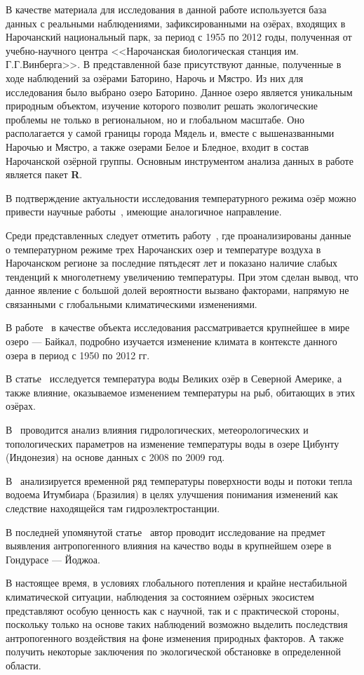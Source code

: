 В качестве материала для исследования в данной работе используется база данных с реальными наблюдениями, зафиксированными на озёрах, входящих в Нарочанский национальный парк, за период с 1955 по 2012 годы, полученная от учебно-научного центра <<Нарочанская биологическая станция им. Г.Г.Винберга>>. В представленной базе присутствуют данные, полученные в ходе наблюдений за озёрами Баторино, Нарочь и Мястро. Из них для исследования было выбрано озеро Баторино. Данное озеро является уникальным природным объектом, изучение которого позволит решать экологические проблемы не только в региональном, но и глобальном масштабе. Оно располагается у самой границы города Мядель и, вместе с вышеназванными Нарочью и Мястро, а также озерами Белое и Бледное, входит в состав Нарочанской озёрной группы. Основным инструментом анализа данных в работе является пакет \textbf{R}.

В подтверждение актуальности исследования температурного режима озёр можно привести научные работы~\cite{zhukova2014, Katz2011, OBrien2012a, Subehi2011, ALCANTARA2011, Chokshi2006}, имеющие аналогичное направление.

Среди представленных следует отметить работу~\cite{zhukova2014}, где проанализированы данные о температурном режиме трех Нарочанских озер и температуре воздуха в Нарочанском регионе за последние пятьдесят лет и показано наличие слабых тенденций к многолетнему увеличению температуры. При этом сделан вывод, что данное явление с большой долей вероятности вызвано факторами, напрямую не связанными с глобальными климатическими изменениями.

В работе~\cite{Katz2011} в качестве объекта исследования рассматривается крупнейшее в мире озеро --- Байкал, подробно изучается изменение климата в контексте данного озера в период с 1950 по 2012 гг.

В статье~\cite{OBrien2012a} исследуется температура воды Великих озёр в Северной Америке, а также влияние, оказываемое изменением температуры на рыб, обитающих в этих озёрах.

В~\cite{Subehi2011} проводится анализ влияния гидрологических, метеорологических и топологических параметров на изменение температуры воды в озере Цибунту (Индонезия) на основе данных с 2008 по 2009 год.

В~\cite{ALCANTARA2011} анализируется временной ряд температуры поверхности воды и потоки тепла водоема Итумбиара (Бразилия) в целях улучшения понимания изменений как следствие находящейся там гидроэлектростанции.

В последней упомянутой статье~\cite{Chokshi2006} автор проводит исследование на предмет выявления антропогенного влияния на качество воды в крупнейшем озере в Гондурасе --- Йоджоа.

В настоящее время, в условиях глобального потепления и крайне нестабильной климатической ситуации, наблюдения за состоянием озёрных экосистем представляют особую ценность как с научной, так и с практической стороны, поскольку только на основе таких наблюдений возможно выделить последствия антропогенного воздействия на фоне изменения природных факторов. А также получить некоторые заключения по экологической обстановке в определенной области.

